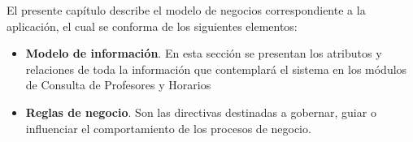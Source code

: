 
El presente capítulo describe el modelo de negocios correspondiente a la aplicación, el cual se conforma de los siguientes elementos:

\begin{itemize}
	
    \item \textbf{Modelo de información}. En esta sección se presentan los atributos y relaciones de toda la información que contemplará el sistema en los módulos de Consulta de Profesores y Horarios

    \item \textbf{Reglas de negocio}. Son las directivas destinadas a gobernar, guiar o influenciar el comportamiento de los procesos de negocio.
     
\end{itemize}

